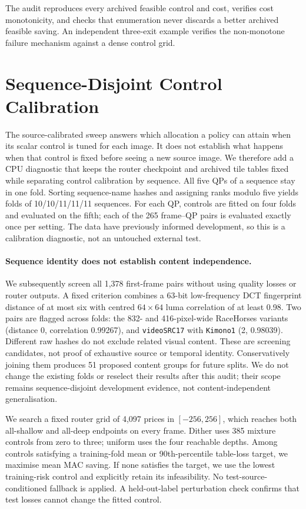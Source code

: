 The audit reproduces every archived feasible control and cost, verifies
cost monotonicity, and checks that enumeration never discards a better
archived feasible saving. An independent three-exit example verifies the
non-monotone failure mechanism against a dense control grid.

\section{Sequence-Disjoint Control Calibration}
\label{sec:crossfit}

The source-calibrated sweep answers which allocation a policy can attain
when its scalar control is tuned for each image. It does not establish what
happens when that control is fixed before seeing a new source image.
We therefore add a CPU diagnostic that keeps the router checkpoint and
archived tile tables fixed while separating control calibration by sequence.
All five QPs of a sequence stay in one fold. Sorting sequence-name hashes
and assigning ranks modulo five yields folds of 10/10/11/11/11 sequences.
For each QP, controls are fitted on four folds and evaluated on the fifth;
each of the 265 frame--QP pairs is evaluated exactly once per setting.
The data have previously informed development, so this is a calibration
diagnostic, not an untouched external test.

\paragraph{Sequence identity does not establish content independence.}
We subsequently screen all 1,378 first-frame pairs without using quality
losses or router outputs. A fixed criterion combines a 63-bit low-frequency
DCT fingerprint distance of at most six with centred $64\times64$ luma
correlation of at least 0.98. Two pairs are flagged across folds:
the 832- and 416-pixel-wide RaceHorses variants (distance 0, correlation
0.99267), and \texttt{videoSRC17} with \texttt{Kimono1} (2, 0.98039).
Different raw hashes do not exclude related visual content. These are
screening candidates, not proof of exhaustive source or temporal identity.
Conservatively joining them produces 51 proposed content groups for future
splits. We do not change the existing folds or reselect their results after
this audit; their scope remains sequence-disjoint development evidence,
not content-independent generalisation.

We search a fixed router grid of 4,097 prices in $[-256,256]$, which reaches
both all-shallow and all-deep endpoints on every frame. Dither uses 385
mixture controls from zero to three; uniform uses the four reachable depths.
Among controls satisfying a training-fold mean or 90th-percentile table-loss
target, we maximise mean MAC saving. If none satisfies the target, we use
the lowest training-risk control and explicitly retain its infeasibility.
No test-source-conditioned fallback is applied. A held-out-label
perturbation check confirms that test losses cannot change the fitted control.

